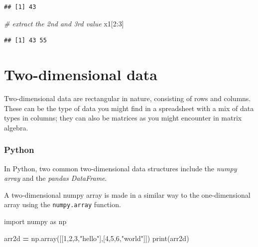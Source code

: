 \documentclass[
]{book}
\newenvironment{Shaded}{\begin{snugshade}}{\end{snugshade}}
\newcommand{\BuiltInTok}[1]{#1}
\newcommand{\CommentTok}[1]{\textcolor[rgb]{0.56,0.35,0.01}{\textit{#1}}}
\newcommand{\DecValTok}[1]{\textcolor[rgb]{0.00,0.00,0.81}{#1}}
\newcommand{\ImportTok}[1]{#1}
\newcommand{\NormalTok}[1]{#1}
\newcommand{\OperatorTok}[1]{\textcolor[rgb]{0.81,0.36,0.00}{\textbf{#1}}}
\newcommand{\SpecialCharTok}[1]{\textcolor[rgb]{0.00,0.00,0.00}{#1}}
\newcommand{\StringTok}[1]{\textcolor[rgb]{0.31,0.60,0.02}{#1}}
\begin{document}
\begin{verbatim}
## [1] 43
\end{verbatim}

\begin{Shaded}
\begin{Highlighting}[]
\CommentTok{\# extract the 2nd and 3rd value}
\NormalTok{x1[}\DecValTok{2}\SpecialCharTok{:}\DecValTok{3}\NormalTok{]}
\end{Highlighting}
\end{Shaded}

\begin{verbatim}
## [1] 43 55
\end{verbatim}

\hypertarget{two-dimensional-data}{%
\section{Two-dimensional data}\label{two-dimensional-data}}

Two-dimensional data are rectangular in nature, consisting of rows and columns. These can be the type of data you might find in a spreadsheet with a mix of data types in columns; they can also be matrices as you might encounter in matrix algebra.

\hypertarget{python-9}{%
\subsubsection*{Python}\label{python-9}}

In Python, two common two-dimensional data structures include the \emph{numpy array} and the \emph{pandas DataFrame}.

A two-dimensional numpy array is made in a similar way to the one-dimensional array using the \texttt{numpy.array} function.

\begin{Shaded}
\begin{Highlighting}[]
\ImportTok{import}\NormalTok{ numpy }\ImportTok{as}\NormalTok{ np}

\NormalTok{arr2d }\OperatorTok{=}\NormalTok{ np.array([[}\DecValTok{1}\NormalTok{,}\DecValTok{2}\NormalTok{,}\DecValTok{3}\NormalTok{,}\StringTok{"hello"}\NormalTok{],[}\DecValTok{4}\NormalTok{,}\DecValTok{5}\NormalTok{,}\DecValTok{6}\NormalTok{,}\StringTok{"world"}\NormalTok{]])}
\BuiltInTok{print}\NormalTok{(arr2d)}
\end{Highlighting}
\end{Shaded}
\end{document}
